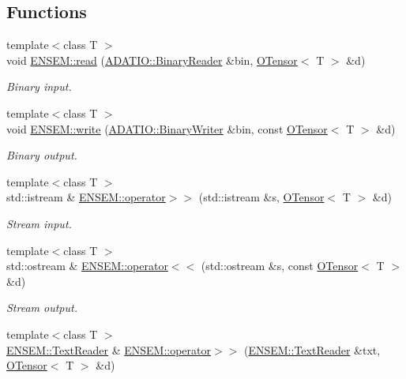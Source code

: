 \subsection*{Functions}
\begin{DoxyCompactItemize}
\item 
{\footnotesize template$<$class T $>$ }\\void \mbox{\hyperlink{group__obstensor_ga99e7dbdd85834a965f5483165945d05a}{E\+N\+S\+E\+M\+::read}} (\mbox{\hyperlink{classADATIO_1_1BinaryReader}{A\+D\+A\+T\+I\+O\+::\+Binary\+Reader}} \&bin, \mbox{\hyperlink{classENSEM_1_1OTensor}{O\+Tensor}}$<$ T $>$ \&d)
\begin{DoxyCompactList}\small\item\em Binary input. \end{DoxyCompactList}\item 
{\footnotesize template$<$class T $>$ }\\void \mbox{\hyperlink{group__obstensor_gaef90d8549fa5fa0469beb39b348ca8fd}{E\+N\+S\+E\+M\+::write}} (\mbox{\hyperlink{classADATIO_1_1BinaryWriter}{A\+D\+A\+T\+I\+O\+::\+Binary\+Writer}} \&bin, const \mbox{\hyperlink{classENSEM_1_1OTensor}{O\+Tensor}}$<$ T $>$ \&d)
\begin{DoxyCompactList}\small\item\em Binary output. \end{DoxyCompactList}\item 
{\footnotesize template$<$class T $>$ }\\std\+::istream \& \mbox{\hyperlink{group__obstensor_ga6a7ad5b01079729a5dee60bd7e98e6e1}{E\+N\+S\+E\+M\+::operator$>$$>$}} (std\+::istream \&s, \mbox{\hyperlink{classENSEM_1_1OTensor}{O\+Tensor}}$<$ T $>$ \&d)
\begin{DoxyCompactList}\small\item\em Stream input. \end{DoxyCompactList}\item 
{\footnotesize template$<$class T $>$ }\\std\+::ostream \& \mbox{\hyperlink{group__obstensor_gad4f1a718046854030a9c11c1a6d21712}{E\+N\+S\+E\+M\+::operator$<$$<$}} (std\+::ostream \&s, const \mbox{\hyperlink{classENSEM_1_1OTensor}{O\+Tensor}}$<$ T $>$ \&d)
\begin{DoxyCompactList}\small\item\em Stream output. \end{DoxyCompactList}\item 
{\footnotesize template$<$class T $>$ }\\\mbox{\hyperlink{classENSEM_1_1TextReader}{E\+N\+S\+E\+M\+::\+Text\+Reader}} \& \mbox{\hyperlink{group__obstensor_ga605e67dfa1237293bf39540ec4000032}{E\+N\+S\+E\+M\+::operator$>$$>$}} (\mbox{\hyperlink{classENSEM_1_1TextReader}{E\+N\+S\+E\+M\+::\+Text\+Reader}} \&txt, \mbox{\hyperlink{classENSEM_1_1OTensor}{O\+Tensor}}$<$ T $>$ \&d)

\end{DoxyCompactItemize}
